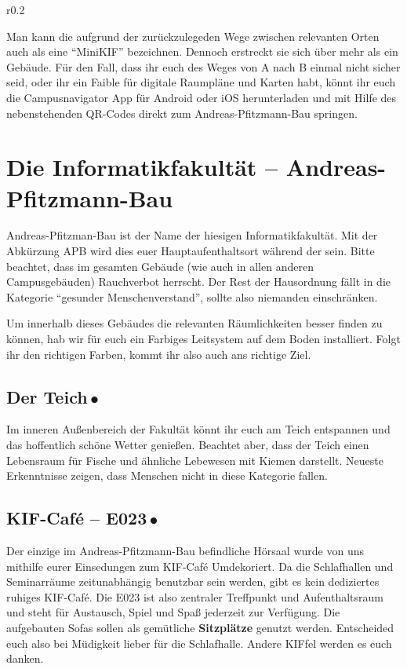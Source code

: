 
\begin{wrapfigure}{r}{0.2\textwidth}
  \vspace*{-11pt}
  \textcolor{KIFgrey}{}
\end{wrapfigure}

Man kann die \KIF{} aufgrund der zurückzulegeden Wege zwischen relevanten Orten auch als eine \enquote{MiniKIF} bezeichnen. Dennoch erstreckt sie sich über mehr als ein Gebäude.
Für den Fall, dass ihr euch des Weges von A nach B einmal nicht sicher seid, oder ihr ein Faible für digitale Raumpläne und Karten habt, könnt ihr euch die Campusnavigator App für Android  oder iOS  herunterladen und mit Hilfe des nebenstehenden QR-Codes direkt zum Andreas-Pfitzmann-Bau springen.

\section*{Die Informatikfakultät -- Andreas-Pfitzmann-Bau}
Andreas-Pfitzman-Bau ist der Name der hiesigen Informatikfakultät. Mit der Abkürzung APB wird dies euer Hauptaufenthaltsort während der \KIF{} sein.
Bitte beachtet, dass im gesamten Gebäude (wie auch in allen anderen Campusgebäuden) Rauchverbot herrscht.
Der Rest der Hausordnung fällt in die Kategorie \enquote{gesunder Menschenverstand}, sollte also niemanden einschränken.

Um innerhalb dieses Gebäudes die relevanten Räumlichkeiten besser finden zu können, hab wir für euch ein Farbiges Leitsystem auf dem Boden installiert.
Folgt ihr den richtigen Farben, kommt ihr also auch ans richtige Ziel.

\subsection*{Der Teich{\,\color{StripePond}$\bullet$\,}}
Im inneren Außenbereich der Fakultät könnt ihr euch am Teich entspannen und das hoffentlich schöne Wetter genießen.
Beachtet aber, dass der Teich einen Lebensraum für Fische und ähnliche Lebewesen mit Kiemen darstellt.
Neueste Erkenntnisse zeigen, dass Menschen nicht in diese Kategorie fallen.

\subsection*{KIF-Café -- E023{\,\color{StripeCafe}$\bullet$\,}}
Der einzige im Andreas-Pfitzmann-Bau befindliche Hörsaal wurde von uns mithilfe eurer Einsedungen zum KIF-Café Umdekoriert.
Da die Schlafhallen und Seminarräume zeitunabhängig benutzbar sein werden, gibt es kein dediziertes ruhiges KIF-Café.
Die E023 ist also zentraler Treffpunkt und Aufenthaltsraum und steht für Austausch, Spiel und Spaß jederzeit zur Verfügung.
Die aufgebauten Sofas sollen als gemütliche \textbf{Sitzplätze} genutzt werden.
Entscheided euch also bei Müdigkeit lieber für die Schlafhalle.
Andere KIFfel werden es euch danken.

